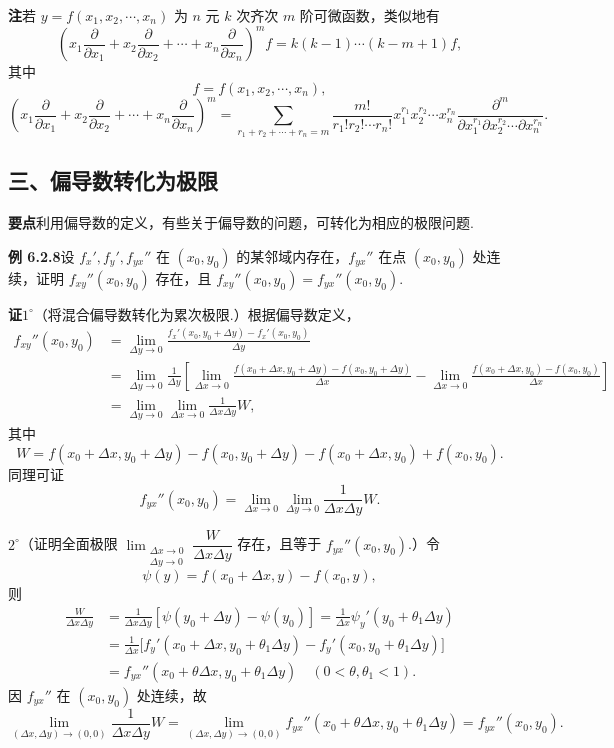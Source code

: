 \documentclass[UTF8,12pt,a4paper,fontset=fandol]{ctexart}
\begin{document}
\noindent\textbf{注}\quad 若 $y=f(x_1,x_2,\cdots,x_n)$ 为 $n$ 元 $k$ 次齐次 $m$ 阶可微函数，类似地有
\[
  \left(x_1\frac{\partial}{\partial x_1}+x_2\frac{\partial}{\partial x_2}+\cdots+x_n\frac{\partial}{\partial x_n}\right)^m f
  =k(k-1)\cdots(k-m+1)f,
\]
其中
\[
  f=f(x_1,x_2,\cdots,x_n),
\]
\[
  \left(x_1\frac{\partial}{\partial x_1}+x_2\frac{\partial}{\partial x_2}+\cdots+x_n\frac{\partial}{\partial x_n}\right)^m
  =
  \sum_{r_1+r_2+\cdots+r_n=m}\frac{m!}{r_1!r_2!\cdots r_n!}
  x_1^{r_1}x_2^{r_2}\cdots x_n^{r_n}
  \frac{\partial^m}{\partial x_1^{r_1}\partial x_2^{r_2}\cdots\partial x_n^{r_n}}.
\]

\subsection*{三、偏导数转化为极限}

\noindent\textbf{要点}\quad 利用偏导数的定义，有些关于偏导数的问题，可转化为相应的极限问题.

\noindent\textbf{例 6.2.8}\quad 设 $f_x',f_y',f_{yx}''$ 在 $(x_0,y_0)$ 的某邻域内存在，$f_{yx}''$ 在点 $(x_0,y_0)$ 处连续，证明 $f_{xy}''(x_0,y_0)$ 存在，且 $f_{xy}''(x_0,y_0)=f_{yx}''(x_0,y_0)$.

\noindent\textbf{证}\quad $1^\circ$（将混合偏导数转化为累次极限.）根据偏导数定义，
\[
\begin{aligned}
f_{xy}''(x_0,y_0)
&=\lim_{\Delta y\to0}\frac{f_x'(x_0,y_0+\Delta y)-f_x'(x_0,y_0)}{\Delta y}\\
&=\lim_{\Delta y\to0}\frac1{\Delta y}\left[
\lim_{\Delta x\to0}\frac{f(x_0+\Delta x,y_0+\Delta y)-f(x_0,y_0+\Delta y)}{\Delta x}
-\lim_{\Delta x\to0}\frac{f(x_0+\Delta x,y_0)-f(x_0,y_0)}{\Delta x}\right]\\
&=\lim_{\Delta y\to0}\lim_{\Delta x\to0}\frac1{\Delta x\Delta y}W,
\end{aligned}
\]
其中
\[
  W=f(x_0+\Delta x,y_0+\Delta y)-f(x_0,y_0+\Delta y)-f(x_0+\Delta x,y_0)+f(x_0,y_0).
\]
同理可证
\[
  f_{yx}''(x_0,y_0)=\lim_{\Delta x\to0}\lim_{\Delta y\to0}\frac1{\Delta x\Delta y}W.
\]

$2^\circ$（证明全面极限 $\displaystyle\lim_{\substack{\Delta x\to0\\ \Delta y\to0}}\dfrac{W}{\Delta x\Delta y}$ 存在，且等于 $f_{yx}''(x_0,y_0)$.）令
\[
  \psi(y)=f(x_0+\Delta x,y)-f(x_0,y),
\]
则
\[
\begin{aligned}
\frac{W}{\Delta x\Delta y}
&=\frac1{\Delta x\Delta y}[\psi(y_0+\Delta y)-\psi(y_0)]
=\frac1{\Delta x}\psi_y'(y_0+\theta_1\Delta y)\\
&=\frac1{\Delta x}\bigl[f_y'(x_0+\Delta x,y_0+\theta_1\Delta y)-f_y'(x_0,y_0+\theta_1\Delta y)\bigr]\\
&=f_{yx}''(x_0+\theta\Delta x,y_0+\theta_1\Delta y)\quad(0<\theta,\theta_1<1).
\end{aligned}
\]
因 $f_{yx}''$ 在 $(x_0,y_0)$ 处连续，故
\[
  \lim_{(\Delta x,\Delta y)\to(0,0)}\frac1{\Delta x\Delta y}W
  =\lim_{(\Delta x,\Delta y)\to(0,0)}f_{yx}''(x_0+\theta\Delta x,y_0+\theta_1\Delta y)
  =f_{yx}''(x_0,y_0).
\]
\end{document}

